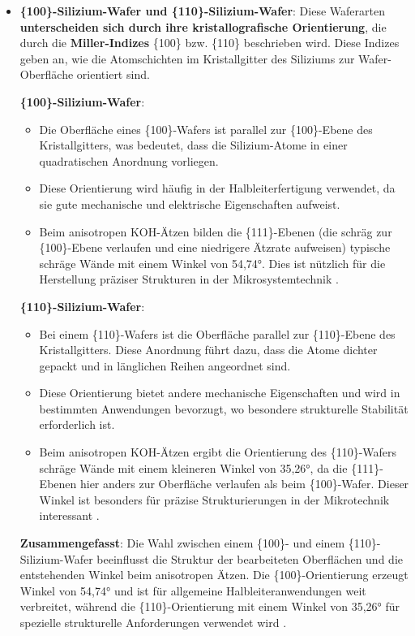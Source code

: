\documentclass{article} %
\begin{document}
\begin{itemize}
    \item \textbf{\{100\}-Silizium-Wafer und \{110\}-Silizium-Wafer}: Diese Waferarten \textbf{unterscheiden sich durch ihre kristallografische Orientierung}, die durch die \textbf{Miller-Indizes} \{100\} bzw. \{110\} beschrieben wird. Diese Indizes geben an, wie die Atomschichten im Kristallgitter des Siliziums zur Wafer-Oberfläche orientiert sind.

    \textbf{\{100\}-Silizium-Wafer}:
    \begin{itemize}
        \item Die Oberfläche eines \{100\}-Wafers ist parallel zur \{100\}-Ebene des Kristallgitters, was bedeutet, dass die Silizium-Atome in einer quadratischen Anordnung vorliegen.
        \item Diese Orientierung wird häufig in der Halbleiterfertigung verwendet, da sie gute mechanische und elektrische Eigenschaften aufweist.
        \item Beim anisotropen KOH-Ätzen bilden die \{111\}-Ebenen (die schräg zur \{100\}-Ebene verlaufen und eine niedrigere Ätzrate aufweisen) typische schräge Wände mit einem Winkel von 54,74°. Dies ist nützlich für die Herstellung präziser Strukturen in der Mikrosystemtechnik \cite{madou2002}.
    \end{itemize}
    
    \textbf{\{110\}-Silizium-Wafer}:
    \begin{itemize}
        \item Bei einem \{110\}-Wafers ist die Oberfläche parallel zur \{110\}-Ebene des Kristallgitters. Diese Anordnung führt dazu, dass die Atome dichter gepackt und in länglichen Reihen angeordnet sind.
        \item Diese Orientierung bietet andere mechanische Eigenschaften und wird in bestimmten Anwendungen bevorzugt, wo besondere strukturelle Stabilität erforderlich ist.
        \item Beim anisotropen KOH-Ätzen ergibt die Orientierung des \{110\}-Wafers schräge Wände mit einem kleineren Winkel von 35,26°, da die \{111\}-Ebenen hier anders zur Oberfläche verlaufen als beim \{100\}-Wafer. Dieser Winkel ist besonders für präzise Strukturierungen in der Mikrotechnik interessant \cite{seidel1990}.
    \end{itemize}
    
    \textbf{Zusammengefasst}: Die Wahl zwischen einem \{100\}- und einem \{110\}-Silizium-Wafer beeinflusst die Struktur der bearbeiteten Oberflächen und die entstehenden Winkel beim anisotropen Ätzen. Die \{100\}-Orientierung erzeugt Winkel von 54,74° und ist für allgemeine Halbleiteranwendungen weit verbreitet, während die \{110\}-Orientierung mit einem Winkel von 35,26° für spezielle strukturelle Anforderungen verwendet wird \cite{kittel2004, ashcroft1976}.
\end{itemize}
\end{document}

